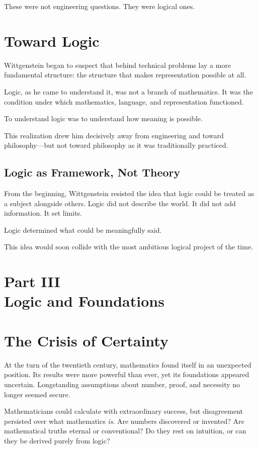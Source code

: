 \documentclass[11pt]{article}
\begin{document}
These were not engineering questions. They were logical ones.

\section*{Toward Logic}

Wittgenstein began to suspect that behind technical problems lay a more fundamental structure: the structure that makes representation possible at all.

Logic, as he came to understand it, was not a branch of mathematics. It was the condition under which mathematics, language, and representation functioned.

To understand logic was to understand how meaning is possible.

This realization drew him decisively away from engineering and toward philosophy—but not toward philosophy as it was traditionally practiced.

\subsection*{Logic as Framework, Not Theory}

From the beginning, Wittgenstein resisted the idea that logic could be treated as a subject alongside others. Logic did not describe the world. It did not add information. It set limits.

Logic determined what could be meaningfully said.

This idea would soon collide with the most ambitious logical project of the time.

\newpage
\section*{Part III \\ Logic and Foundations}

\section*{The Crisis of Certainty}

At the turn of the twentieth century, mathematics found itself in an unexpected position. Its results were more powerful than ever, yet its foundations appeared uncertain. Longstanding assumptions about number, proof, and necessity no longer seemed secure.

Mathematicians could calculate with extraordinary success, but disagreement persisted over what mathematics \emph{is}. Are numbers discovered or invented? Are mathematical truths eternal or conventional? Do they rest on intuition, or can they be derived purely from logic?
\end{document}
